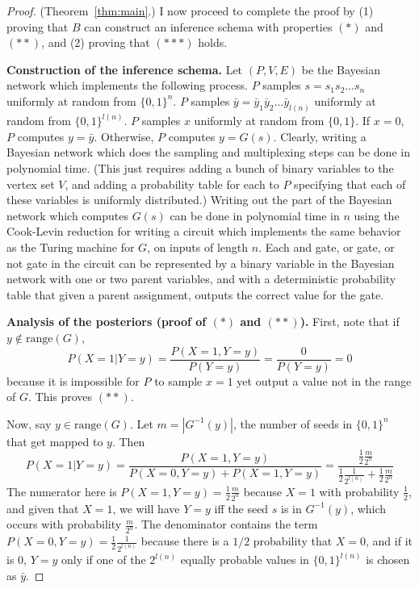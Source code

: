 \documentclass{article}
\theoremstyle{definition}
\theoremstyle{remark}
\begin{document}
\begin{proof}{(Theorem~\ref{thm:main}.)}
I now proceed to complete the proof by (1) proving that $B$ can construct an inference schema with properties $(*)$ and $(**)$, and (2) proving that $(***)$ holds.

\medskip
\noindent \textbf{Construction of the inference schema.}
Let $(P, V, E)$ be the Bayesian network which implements the following process.
$P$ samples $s = s_1 s_2 \dots s_n$ uniformly at random from $\{0, 1\}^n$.
$P$ samples $\bar{y} = \bar{y}_1 \bar{y}_2 \dots \bar{y}_{l(n)}$ uniformly at random from $\{0, 1\}^{l(n)}$.
$P$ samples $x$ uniformly at random from $\{0, 1\}$.
If $x = 0$, $P$ computes $y = \bar{y}$.
Otherwise, $P$ computes $y = G(s)$.
Clearly, writing a Bayesian network which does the sampling and multiplexing steps can be done in polynomial time.
(This just requires adding a bunch of binary variables to the vertex set $V$, and adding a probability table for each to $P$ specifying that each of these variables is uniformly distributed.)
Writing out the part of the Bayesian network which computes $G(s)$ can be done in polynomial time in $n$ using the Cook-Levin reduction for writing a circuit which implements the same behavior as the Turing machine for $G$, on inputs of length $n$.
Each and gate, or gate, or not gate in the circuit can be represented by a binary variable in the Bayesian network with one or two parent variables, and with a deterministic probability table that given a parent assignment, outputs the correct value for the gate.

\medskip
\noindent \textbf{Analysis of the posteriors (proof of $(*)$ and $(**)$).}
First, note that if $y \notin \text{range}(G)$,
$$
P(X = 1 | Y = y) = \frac{P(X = 1, Y = y)}{P(Y = y)} = \frac{0}{P(Y = y)} = 0
$$
because it is impossible for $P$ to sample $x = 1$ yet output a value not in the range of $G$.
This proves $(**)$.

Now, say $y \in \text{range}(G)$.
Let $m = |G^{-1}(y)|$, the number of seeds in $\{0, 1\}^n$ that get mapped to $y$.
Then
$$
P(X = 1 | Y = y) = \frac{P(X = 1, Y = y)}{P(X = 0, Y = y) + P(X = 1, Y = y)}
= \frac{
    \frac{1}{2} \frac{m}{2^n}
}{
    \frac{1}{2} \frac{1}{2^{l(n)}} + \frac{1}{2} \frac{m}{2^n}
}
$$
The numerator here is $P(X = 1, Y = y) = \frac{1}{2} \frac{m}{2^n}$ 
because $X = 1$ with probability $\frac{1}{2}$, and given that $X = 1$, we will have $Y = y$ iff the seed $s$ is in $G^{-1}(y)$, which occurs with probability $\frac{m}{2^n}$.
The denominator contains the term $P(X = 0, Y = y) = \frac{1}{2} \frac{1}{2^{l(n)}}$ because there is a $1/2$ probability that $X = 0$, and if it is $0$, $Y = y$ only if one of the $2^{l(n)}$ equally probable values in $\{0, 1\}^{l(n)}$ is chosen as $\bar{y}$.


\end{proof}
\end{document}
